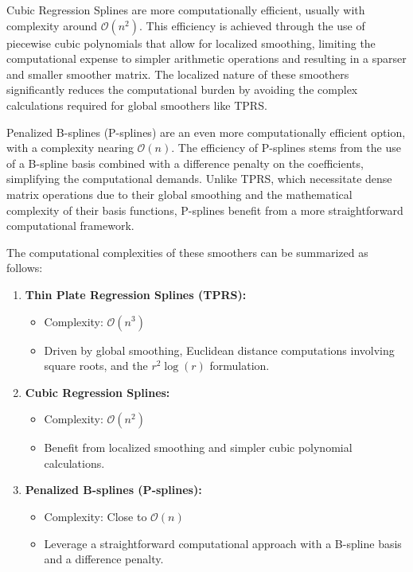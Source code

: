 \documentclass[12pt, twoside,hidelinks]{article}
\theoremstyle{definition}
\numberwithin{equation}{section}
\begin{document}
Cubic Regression Splines are more computationally efficient, usually with complexity around $\mathcal{O}(n^2)$. This efficiency is achieved through the use of piecewise cubic polynomials that allow for localized smoothing, limiting the computational expense to simpler arithmetic operations and resulting in a sparser and smaller smoother matrix. The localized nature of these smoothers significantly reduces the computational burden by avoiding the complex calculations required for global smoothers like TPRS.

Penalized B-splines (P-splines) are an even more computationally efficient option, with a complexity nearing $\mathcal{O}(n)$. The efficiency of P-splines stems from the use of a B-spline basis combined with a difference penalty on the coefficients, simplifying the computational demands. Unlike TPRS, which necessitate dense matrix operations due to their global smoothing and the mathematical complexity of their basis functions, P-splines benefit from a more straightforward computational framework.

The computational complexities of these smoothers can be summarized as follows:

\begin{enumerate}
    \item \textbf{Thin Plate Regression Splines (TPRS):}
    \begin{itemize}
        \item Complexity: $\mathcal{O}(n^3)$
        \item Driven by global smoothing, Euclidean distance computations involving square roots, and the $r^2 \log(r)$ formulation.
    \end{itemize}
    
    \item \textbf{Cubic Regression Splines:}
    \begin{itemize}
        \item Complexity: $\mathcal{O}(n^2)$
        \item Benefit from localized smoothing and simpler cubic polynomial calculations.
    \end{itemize}
    
    \item \textbf{Penalized B-splines (P-splines):}
    \begin{itemize}
        \item Complexity: Close to $\mathcal{O}(n)$
        \item Leverage a straightforward computational approach with a B-spline basis and a difference penalty.
    \end{itemize}
\end{enumerate}
\end{document}
